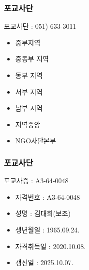 \documentclass[aspectratio=1610,20pt,xcolor=pdftex,dvipsnames,table,handout]{beamer}
\begin{document}
		\begin{frame} [t,plain]
		\frametitle{포교사단 }

			\begin{block} {포교사단  : 051) 633-3011 }
			\setlength{\leftmargini}{2em}			
			\begin{itemize}
				\item 중부지역
				\item 중동부 지역
				\item 동부 지역
				\item 서부 지역
				\item 남부 지역
				\item 지역중앙
				\item NGO사단본부
			\end{itemize}
			\end{block}						
		\end{frame}						


		\begin{frame} [t,plain]
		\frametitle{포교사단 }
			\begin{block} {포교사증  : A3-64-0048}
			\setlength{\leftmargini}{2em}			
			\begin{itemize}
				\item 자격번호 : A3-64-0048
				\item 성명 : 김대희(보조)
				\item 생년월일 : 1965.09.24.

				\item 자격취득일 : 2020.10.08.
				\item 갱신일 : 2025.10.07.
			\end{itemize}
			\end{block}						

		\end{frame}						

		\begin{frame} [t,plain]
		\end{frame}						

\end{document}
